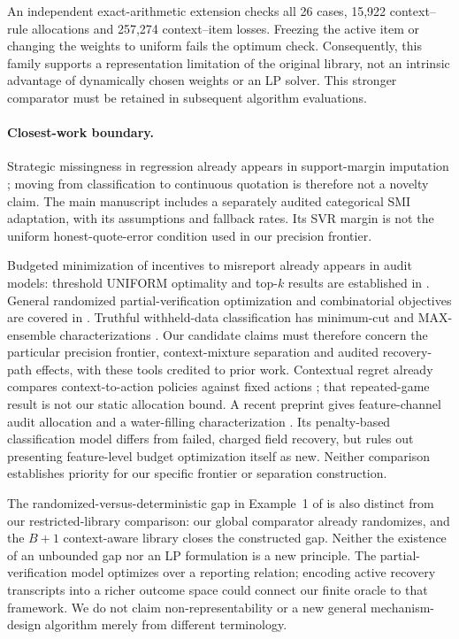 \documentclass[11pt]{article}
\begin{document}
An independent exact-arithmetic extension checks all 26 cases, 15,922
context--rule allocations and 257,274 context--item losses. Freezing the active
item or changing the weights to uniform fails the optimum check. Consequently,
this family supports a representation limitation of the original library,
not an intrinsic advantage of dynamically chosen weights or an LP solver.
This stronger comparator must be retained in subsequent algorithm evaluations.

\paragraph{Closest-work boundary.}
Strategic missingness in regression already appears in support-margin
imputation \cite{smi}; moving from classification to continuous quotation is
therefore not a novelty claim. The main manuscript includes a separately
audited categorical SMI adaptation, with its assumptions and fallback rates.
Its SVR margin is not the uniform honest-quote-error condition used in our
precision frontier.

Budgeted minimization of incentives to misreport already appears in audit
models: threshold UNIFORM optimality and top-$k$ results are established in
\cite{audits}. General randomized partial-verification optimization and
combinatorial objectives are covered in \cite{partial}. Truthful withheld-data
classification has minimum-cut and MAX-ensemble characterizations \cite{withheld}.
Our candidate claims must therefore concern the particular precision frontier,
context-mixture separation and audited recovery-path effects, with these tools
credited to prior work. Contextual regret already compares context-to-action
policies against fixed actions \cite{contextual}; that repeated-game result is
not our static allocation bound. A recent preprint gives feature-channel audit
allocation and a water-filling characterization \cite{auditrisk}. Its penalty-based
classification model differs from failed, charged field recovery, but rules out
presenting feature-level budget optimization itself as new. Neither comparison
establishes priority for our specific frontier or separation construction.

The randomized-versus-deterministic gap in Example~1 of \cite{partial}
is also distinct from our restricted-library comparison: our global comparator
already randomizes, and the $B+1$ context-aware library closes the constructed
gap. Neither the existence of an unbounded gap nor an LP formulation is a new
principle. The partial-verification model optimizes over a reporting relation;
encoding active recovery transcripts into a richer outcome space could connect
our finite oracle to that framework. We do not claim non-representability or
a new general mechanism-design algorithm merely from different terminology.
\end{document}
